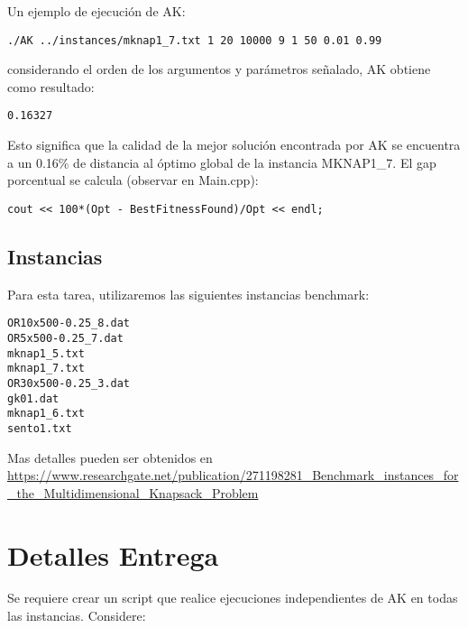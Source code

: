 \documentclass[12pt,spanish,letter]{article}
\begin{document}
Un ejemplo de ejecuci\'on de AK:

\begin{verbatim}
./AK ../instances/mknap1_7.txt 1 20 10000 9 1 50 0.01 0.99
\end{verbatim}

considerando el orden de los argumentos y par\'ametros se\~nalado, AK obtiene como resultado:

\begin{verbatim}
0.16327
\end{verbatim}

Esto significa que la calidad de la mejor soluci\'on encontrada por AK se encuentra a un 0.16\% de distancia al \'optimo global de la instancia MKNAP1\_7. El gap porcentual se calcula (observar en Main.cpp):

\begin{verbatim}
cout << 100*(Opt - BestFitnessFound)/Opt << endl;
\end{verbatim}



\subsection{Instancias}
Para esta tarea, utilizaremos las siguientes instancias benchmark:

\begin{verbatim}
OR10x500-0.25_8.dat
OR5x500-0.25_7.dat
mknap1_5.txt
mknap1_7.txt
OR30x500-0.25_3.dat
gk01.dat
mknap1_6.txt	
sento1.txt
\end{verbatim}

Mas detalles pueden ser obtenidos en \url{https://www.researchgate.net/publication/271198281_Benchmark_instances_for_the_Multidimensional_Knapsack_Problem}

\section{Detalles Entrega}

Se requiere crear un script que realice ejecuciones independientes de AK en todas las instancias. Considere:
\end{document}
